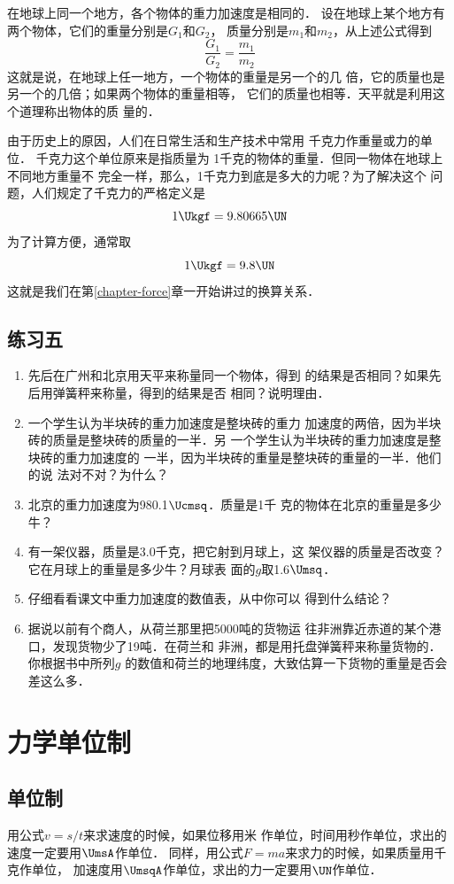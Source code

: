 在地球上同一个地方，各个物体的重力加速度是相同的．
设在地球上某个地方有两个物体，它们的重量分别是$G_1$和$G_2$，
质量分别是$m_1$和$m_2$，从上述公式得到
\[\frac{G_1}{G_2}=\frac{m_1}{m_2} \]
这就是说，在地球上任一地方，一个物体的重量是另一个的几
倍，它的质量也是另一个的几倍；如果两个物体的重量相等，
它们的质量也相等．天平就是利用这个道理称出物体的质
量的．

由于历史上的原因，人们在日常生活和生产技术中常用
千克力作重量或力的单位．
千克力这个单位原来是指质量为
1千克的物体的重量．但同一物体在地球上不同地方重量不
完全一样，那么，1千克力到底是多大的力呢？为了解决这个
问题，人们规定了千克力的严格定义是
                  \[1 \Ukgf=9.80665\UN\]
为了计算方便，通常取
                    \[1 \Ukgf =9.8 \UN\]
这就是我们在第\ref{chapter-force}章一开始讲过的换算关系．

\subsection*{练习五}
\begin{enumerate}
\item 先后在广州和北京用天平来称量同一个物体，得到
的结果是否相同？如果先后用弹簧秤来称量，得到的结果是否
相同？说明理由．
\item 一个学生认为半块砖的重力加速度是整块砖的重力
加速度的两倍，因为半块砖的质量是整块砖的质量的一半．另
一个学生认为半块砖的重力加速度是整块砖的重力加速度的
一半，因为半块砖的重量是整块砖的重量的一半．他们的说
法对不对？为什么？
\item 北京的重力加速度为980.1$ \Ucmsq $．质量是1千
克的物体在北京的重量是多少牛？
\item 有一架仪器，质量是3.0千克，把它射到月球上，这
架仪器的质量是否改变？它在月球上的重量是多少牛？月球表
面的$g$取1.6$\Umsq$．
\item 仔细看看课文中重力加速度的数值表，从中你可以
得到什么结论？
\item 据说以前有个商人，从荷兰那里把5000吨的货物运
往非洲靠近赤道的某个港口，发现货物少了19吨．在荷兰和
非洲，都是用托盘弹簧秤来称量货物的．你根据书中所列$g$
的数值和荷兰的地理纬度，大致估算一下货物的重量是否会
差这么多．
\end{enumerate}

\section{力学单位制}
\subsection{单位制}
用公式$v=s/t$来求速度的时候，如果位移用米
作单位，时间用秒作单位，求出的速度一定要用$\UmsA$作单位．
同样，用公式$F=ma$来求力的时候，如果质量用千克作单位，
加速度用$\UmsqA$作单位，求出的力一定要用$\UN$作单位．

